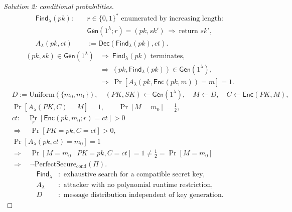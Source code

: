 \documentclass[12pt,a4paper]{article}
\begin{document}
\begin{samepage}
\begin{proof}[Solution 2: conditional probabilities]
\[
\begin{aligned}
\mathsf{Find}_\lambda(pk):\quad
&r\in\{0,1\}^{*}\text{ enumerated by increasing length}:\\
&\mathsf{Gen}(1^\lambda;r)=(pk,sk')\ \Longrightarrow\ \text{return }sk',\\
A_\lambda(pk,ct)&:=\mathsf{Dec}(\mathsf{Find}_\lambda(pk),ct).
\end{aligned}
\]
\[
\begin{aligned}
(pk,sk)\in\mathsf{Gen}(1^\lambda)
&\Longrightarrow\ \mathsf{Find}_\lambda(pk)\text{ terminates},\\
&\Longrightarrow\ (pk,\mathsf{Find}_\lambda(pk))\in\mathsf{Gen}(1^\lambda),\\
&\Longrightarrow\ \Pr[A_\lambda(pk,\mathsf{Enc}(pk,m))=m]=1.
\end{aligned}
\]
\[
\begin{aligned}
&D:=\mathrm{Uniform}(\{m_0,m_1\}),\quad
(PK,SK)\leftarrow\mathsf{Gen}(1^\lambda),\quad
M\leftarrow D,\quad C\leftarrow\mathsf{Enc}(PK,M),\\
&\Pr[A_\lambda(PK,C)=M]=1,\qquad \Pr[M=m_0]=\tfrac12,\\
&ct:\quad\Pr_r[\mathsf{Enc}(pk,m_0;r)=ct]>0\\
&\Longrightarrow\quad\Pr[PK=pk,C=ct]>0,\\
&\Pr[A_\lambda(pk,ct)=m_0]=1\\
&\Longrightarrow\quad\Pr[M=m_0\mid PK=pk,C=ct]=1\ne\tfrac12=\Pr[M=m_0]\\
&\Longrightarrow\quad\neg\mathrm{PerfectSecure}_{\mathrm{cond}}(\Pi).
\end{aligned}
\]
\[
\begin{aligned}
\mathsf{Find}_\lambda&:\text{ exhaustive search for a compatible secret key},\\
A_\lambda&:\text{ attacker with no polynomial runtime restriction},\\
D&:\text{ message distribution independent of key generation}.
\end{aligned}
\]
\end{proof}
\end{samepage}
\end{document}
